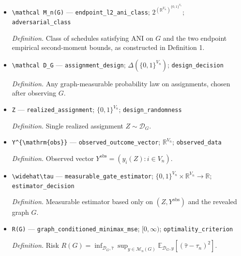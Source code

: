 \documentclass{article}
\begin{document}
\begin{itemize}
  \par\smallskip\noindent\emph{Definition.} Full-population contrast \(\tau_n=\mu_1-\mu_0=n^{-1}\sum_{i\in V_n}(a_i-b_i)\).
  \item \texttt{\textbackslash{}\allowbreak{}mathcal M\_\allowbreak{}n(G)} --- \texttt{endpoint\_\allowbreak{}l2\_\allowbreak{}ani\_\allowbreak{}class}; \(2^{(\mathbb R^{V_n})^{\{0,1\}^{V_n}}}\); \texttt{adversarial\_\allowbreak{}class}
  \par\smallskip\noindent\emph{Definition.} Class of schedules satisfying ANI on \(G\) and the two endpoint empirical second-moment bounds, as constructed in Definition 1.
  \item \texttt{\textbackslash{}\allowbreak{}mathcal D\_\allowbreak{}G} --- \texttt{assignment\_\allowbreak{}design}; \(\Delta(\{0,1\}^{V_n})\); \texttt{design\_\allowbreak{}decision}
  \par\smallskip\noindent\emph{Definition.} Any graph-measurable probability law on assignments, chosen after observing \(G\).
  \item \texttt{Z} --- \texttt{realized\_\allowbreak{}assignment}; \(\{0,1\}^{V_n}\); \texttt{design\_\allowbreak{}randomness}
  \par\smallskip\noindent\emph{Definition.} Single realized assignment \(Z\sim\mathcal D_G\).
  \item \texttt{Y\textasciicircum{}\{\textbackslash{}\allowbreak{}mathrm\{obs\}\allowbreak{}\}\allowbreak{}} --- \texttt{observed\_\allowbreak{}outcome\_\allowbreak{}vector}; \(\mathbb R^{V_n}\); \texttt{observed\_\allowbreak{}data}
  \par\smallskip\noindent\emph{Definition.} Observed vector \(Y^{\mathrm{obs}}=(y_i(Z):i\in V_n)\).
  \item \texttt{\textbackslash{}\allowbreak{}widehat\textbackslash{}\allowbreak{}tau} --- \texttt{measurable\_\allowbreak{}gate\_\allowbreak{}estimator}; \(\{0,1\}^{V_n}\times\mathbb R^{V_n}\to\mathbb R\); \texttt{estimator\_\allowbreak{}decision}
  \par\smallskip\noindent\emph{Definition.} Measurable estimator based only on \((Z,Y^{\mathrm{obs}})\) and the revealed graph \(G\).
  \item \texttt{R(G)} --- \texttt{graph\_\allowbreak{}conditioned\_\allowbreak{}minimax\_\allowbreak{}mse}; \([0,\infty)\); \texttt{optimality\_\allowbreak{}criterion}
  \par\smallskip\noindent\emph{Definition.} Risk \(R(G)=\inf_{\mathcal D_G,\widehat\tau}\sup_{y\in\mathcal M_n(G)}\mathbb E_{\mathcal D_G,y}[(\widehat\tau-\tau_n)^2]\).

\end{itemize}
\end{document}
